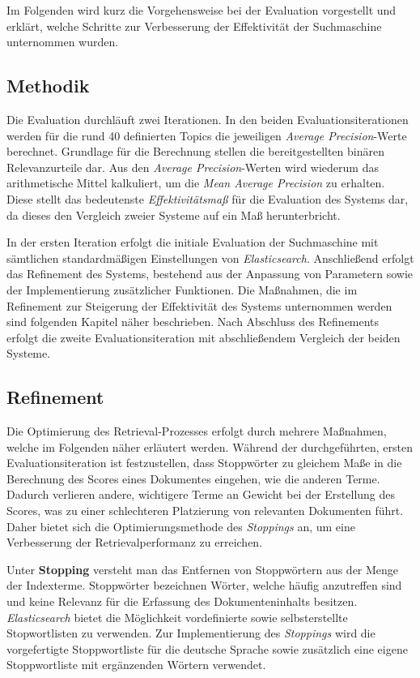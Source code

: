 \documentclass[11pt,a4paper, halfparskip]{scrartcl}
\begin{document}
Im Folgenden wird kurz die Vorgehensweise bei der Evaluation vorgestellt und erklärt, welche Schritte zur Verbesserung der Effektivität der Suchmaschine unternommen wurden.

\subsection{Methodik}

Die Evaluation durchläuft zwei Iterationen.
In den beiden Evaluationsiterationen werden für die rund 40 definierten Topics die jeweiligen \textit{Average Precision}-Werte berechnet. 
Grundlage für die Berechnung stellen die bereitgestellten binären Relevanzurteile dar.
Aus den \textit{Average Precision}-Werten wird wiederum das arithmetische Mittel kalkuliert, um die \textit{Mean Average Precision} zu erhalten.
Diese stellt das bedeutenste \textit{Effektivitätsmaß} für die Evaluation des Systems dar, da dieses den Vergleich zweier Systeme auf ein Maß herunterbricht.

In der ersten Iteration erfolgt die initiale Evaluation der Suchmaschine mit sämtlichen standardmäßigen Einstellungen von \textit{Elasticsearch}.
Anschließend erfolgt das Refinement des Systems, bestehend aus der Anpassung von Parametern sowie der Implementierung zusätzlicher Funktionen. 
Die Maßnahmen, die im Refinement zur Steigerung der Effektivität des Systems unternommen werden sind folgenden Kapitel näher beschrieben. 
Nach Abschluss des Refinements erfolgt die zweite Evaluationsiteration mit abschließendem Vergleich der beiden Systeme. 

\subsection{Refinement}

Die Optimierung des Retrieval-Prozesses erfolgt durch mehrere Maßnahmen, welche im Folgenden näher erläutert werden.
Während der durchgeführten, ersten Evaluationsiteration ist festzustellen, dass Stoppwörter zu gleichem Maße in die Berechnung des Scores eines Dokumentes eingehen, wie die anderen Terme.
Dadurch verlieren andere, wichtigere Terme an Gewicht bei der Erstellung des Scores, was zu einer schlechteren Platzierung von relevanten Dokumenten führt.
Daher bietet sich die Optimierungsmethode des \textit{Stoppings} an, um eine Verbesserung der Retrievalperformanz zu erreichen.

Unter \textbf{Stopping} versteht man das Entfernen von Stoppwörtern aus der Menge der Indexterme.
Stoppwörter bezeichnen Wörter, welche häufig anzutreffen sind und keine Relevanz für die Erfassung des Dokumenteninhalts besitzen.
\textit{Elasticsearch} bietet die Möglichkeit vordefinierte sowie selbsterstellte Stopwortlisten zu verwenden.
Zur Implementierung des \textit{Stoppings} wird die vorgefertigte Stoppwortliste für die deutsche Sprache sowie zusätzlich eine eigene Stoppwortliste mit ergänzenden Wörtern verwendet. 
\end{document}
